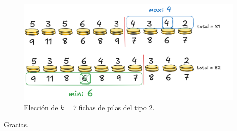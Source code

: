 \documentclass[12pt]{beamer}
\begin{document}
\begin{frame}
\begin{bloque}

\begin{figure}
    \centering
    \includegraphics[width=0.97\linewidth]{img/coins-greedy.png}
    \caption{Elección de $k=7$ fichas de pilas del tipo 2.}
    \label{fig:enter-label}
\end{figure}

\end{bloque}
\end{frame}

\begin{frame}

\centering
\Large Gracias.

\end{frame}
\end{document}

